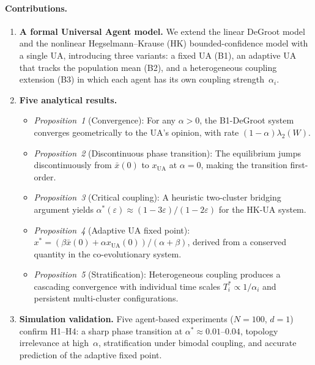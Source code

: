 \documentclass{article}
\theoremstyle{plain}
\theoremstyle{definition}
\theoremstyle{remark}
\newcommand{\xUA}{x_{\mathrm{UA}}}
\newcommand{\xbar}{\bar{x}}
\begin{document}
\paragraph{Contributions.}
\begin{enumerate}
    \item \textbf{A formal Universal Agent model.} We extend the linear
    DeGroot model and the nonlinear Hegselmann--Krause (HK) bounded-confidence
    model with a single UA, introducing three variants: a fixed UA (B1),
    an adaptive UA that tracks the population mean (B2), and a heterogeneous
    coupling extension (B3) in which each agent has its own coupling
    strength~$\alpha_i$.

    \item \textbf{Five analytical results.}
    \begin{itemize}
        \item \emph{Proposition~1} (Convergence): For any $\alpha > 0$, the
        B1-DeGroot system converges geometrically to the UA's opinion,
        with rate $(1-\alpha)\lambda_2(W)$.
        \item \emph{Proposition~2} (Discontinuous phase transition): The
        equilibrium jumps discontinuously from $\bar{x}(0)$ to $\xUA$
        at $\alpha = 0$, making the transition first-order.
        \item \emph{Proposition~3} (Critical coupling): A heuristic
        two-cluster bridging argument yields
        $\alpha^*(\varepsilon)\approx(1-3\varepsilon)/(1-2\varepsilon)$
        for the HK-UA system.
        \item \emph{Proposition~4} (Adaptive UA fixed point):
        $x^* = (\beta\xbar(0) + \alpha\xUA(0))/(\alpha+\beta)$,
        derived from a conserved quantity in the co-evolutionary system.
        \item \emph{Proposition~5} (Stratification): Heterogeneous
        coupling produces a cascading convergence with individual time
        scales $T_i^*\propto 1/\alpha_i$ and persistent multi-cluster
        configurations.
    \end{itemize}

    \item \textbf{Simulation validation.} Five agent-based experiments
    ($N=100$, $d=1$) confirm H1--H4: a sharp phase transition at
    $\alpha^*\approx 0.01$--$0.04$, topology irrelevance at high~$\alpha$,
    stratification under bimodal coupling, and accurate prediction of the
    adaptive fixed point.
\end{enumerate}
\end{document}
